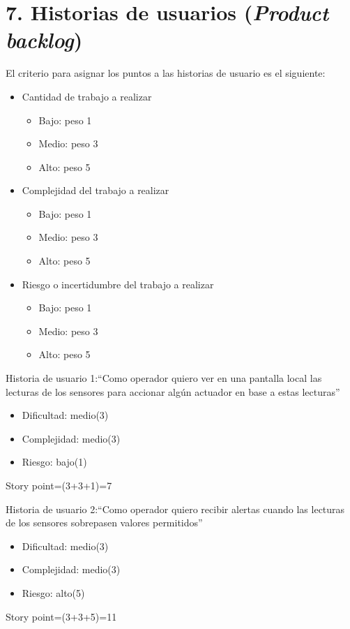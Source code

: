 \documentclass[
11pt, %
codirector, %
]{charter}
\begin{document}
\begin{enumerate}
\end{enumerate}

\newpage
\section{7. Historias de usuarios (\textit{Product backlog})}
\label{sec:backlog}

El criterio para asignar los puntos a las historias de usuario es el siguiente:
\begin{itemize}
	\item Cantidad de trabajo a realizar 
	\begin{itemize}
		\item Bajo: peso 1
		\item Medio: peso 3
		\item Alto: peso 5 
	\end{itemize}
	\item Complejidad del trabajo a realizar
	\begin{itemize}
		\item Bajo: peso 1
		\item Medio: peso 3
		\item Alto: peso 5  
	\end{itemize}
	\item Riesgo o incertidumbre del trabajo a realizar
	\begin{itemize}
		\item Bajo: peso 1
		\item Medio: peso 3
		\item Alto: peso 5  
	\end{itemize}
\end{itemize}

Historia de usuario 1:``Como operador quiero ver en una pantalla local las lecturas de los sensores para accionar algún actuador en base a estas lecturas''
\begin{itemize}
	\item Dificultad: medio(3) 
	\item Complejidad: medio(3)
	\item Riesgo: bajo(1)  
\end{itemize}
Story point=(3+3+1)=7

Historia de usuario 2:``Como operador quiero recibir alertas cuando las lecturas de los sensores sobrepasen valores permitidos''
\begin{itemize}
	\item Dificultad: medio(3) 
	\item Complejidad: medio(3)
	\item Riesgo: alto(5)
\end{itemize}
Story point=(3+3+5)=11
\end{document}
